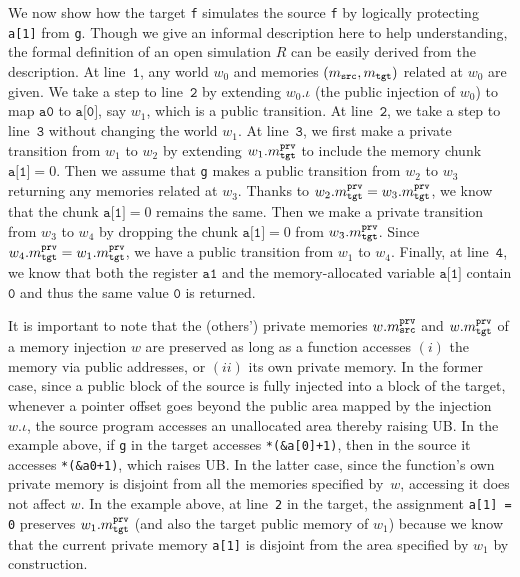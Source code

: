 {We now show how the target \texttt{f} simulates the source \texttt{f}
by logically protecting \texttt{a[1]} from \texttt{g}.
Though we give an informal description here to help understanding,
the formal definition of an open simulation $R$ 
can be easily derived from the description.
At line~$\texttt{1}$, any world $w_0$ and
memories $(m_{\texttt{src}}, m_{\texttt{tgt}})$ related at $w_0$ are given. We take a step
to line~$\texttt{2}$ by extending $w_0.\iota$ (\ie the public
injection of $w_0$) to map $\texttt{a0}$ to $\texttt{a[0]}$, say $w_1$,
which is a public transition. At line~$\texttt{2}$, we take a step
to line~$\texttt{3}$ without changing the world $w_1$.
At line~$\texttt{3}$, we first make a private transition from $w_1$
to $w_2$ by extending $w_1.m^{\texttt{prv}}_{\texttt{tgt}}$
to include the memory chunk $\texttt{a[1]} = 0$.
Then we assume that \texttt{g} makes a public transition from $w_2$ to $w_3$
returning any memories related at $w_3$. Thanks to $w_2.m^{\texttt{prv}}_{\texttt{tgt}} = w_3.m^{\texttt{prv}}_{\texttt{tgt}}$,
we know that the chunk $\texttt{a[1]} = 0$ remains the same.
Then we make a private transition from $w_3$ to $w_4$ by
dropping the chunk $\texttt{a[1]} = 0$ from $w_3.m^{\texttt{prv}}_{\texttt{tgt}}$.
Since $w_4.m^{\texttt{prv}}_{\texttt{tgt}} = w_1.m^{\texttt{prv}}_{\texttt{tgt}}$, we have a public transition from $w_1$ to $w_4$.
Finally, at line~$\texttt{4}$, we know that both the register $\texttt{a1}$ and
the memory-allocated variable $\texttt{a[1]}$ contain
$\texttt{0}$ and thus the same value $\texttt{0}$ is returned.

It is important to note that the (others') private memories $w.m^{\texttt{prv}}_{\texttt{src}}$ and $w.m^{\texttt{prv}}_{\texttt{tgt}}$ of a
memory injection $w$ are preserved as long as a function accesses
$(i)$ the memory via public addresses, or $(ii)$ its own private memory.
In the former case,
since a public block of the source is fully injected into a block of the target,
whenever a pointer offset goes beyond the public area mapped by the injection $w.\iota$,
the source program accesses an unallocated area thereby raising UB.
In the example above, if \texttt{g} in the target accesses \texttt{*(\&a[0]+1)},
then in the source it accesses \texttt{*(\&a0+1)}, which raises UB.
In the latter case, since the function's own private memory
is disjoint from all the memories specified by~$w$,
accessing it does not affect $w$. In the example above, at line~\texttt{2} in the target, 
the assignment \texttt{a[1] = 0} preserves $w_1.m^{\texttt{prv}}_{\texttt{tgt}}$ (and also the target public memory of $w_1$) because we know that
the current private memory \texttt{a[1]} is disjoint from the area specified by $w_1$ by construction.

}
